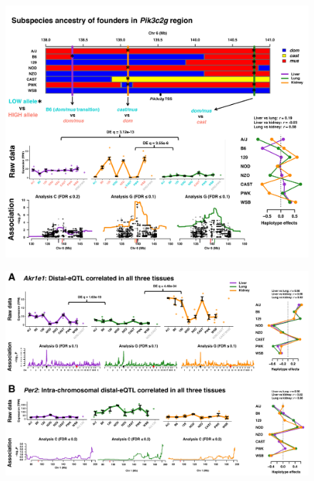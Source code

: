 \documentclass[10pt,letterpaper]{article}
\begin{document}
\begin{figure}[hp]
\includegraphics[width=\textwidth, trim={0in 0.5in 0in 0in}, clip]{figs/pik3c2g_example.pdf}
\caption{}
\end{figure}

\newpage

\begin{figure}[hp]
\includegraphics[width=\textwidth, trim={0in 0in 0in 0in}, clip]{figs/correlated_distal_eqtl.pdf}
\caption{}
\end{figure}

\newpage

\newpage
\end{document}
